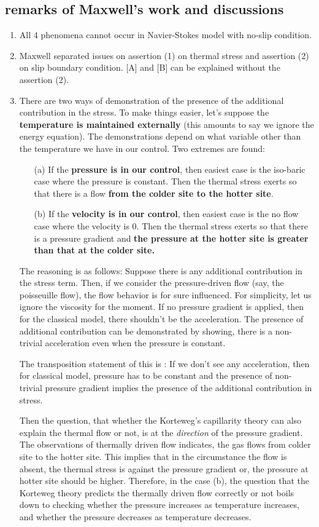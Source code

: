 \documentclass[a4paper,12pt]{article}
\begin{document}
\subsection{remarks of Maxwell's work and discussions}
\begin{enumerate}
 \item All 4 phenomena cannot occur in Navier-Stokes model with no-slip condition.
 \item Maxwell separated issues on assertion (1) on thermal stress and assertion (2) on slip boundary condition. [A] and [B] can be explained without the assertion (2).
 \item There are two ways of demonstration of the presence of the additional contribution in the stress. To make things easier, let's suppose the {\bf temperature is maintained externally} (this amounts to say we ignore the energy equation). The demonstrations depend on what variable other than the temperature we have in our control. Two extremes are found:
 \begin{enumerate}
  \item[(a)] If the {\bf pressure is in our control}, then easiest case is the iso-baric case where the pressure is constant. Then the thermal stress exerts so that there is a flow {\bf from the colder site to the hotter site}.
  \item[(b)] If the {\bf velocity is in our control}, then easiest case is the no flow case where the velocity is $0$. Then the thermal stress exerts so that there is a pressure gradient and {\bf the pressure at the hotter site is greater than that at the colder site.}
 \end{enumerate}

The reasoning is as follows: Suppose there is any additional contribution in the stress term. Then, if we consider the pressure-driven flow (say, the poisseuille flow), the flow behavior is for sure influenced. For simplicity, let us ignore the viscosity for the moment. If no pressure gradient is applied, then for the classical model, there shouldn't be the acceleration. The presence of additional contribution can be demonstrated by showing, there is a non-trivial acceleration even when the pressure is constant. 

The transposition statement of this is : If we don't see any acceleration, then for classical model, pressure has to be constant and the presence of non-trivial pressure gradient implies the presence of the additional contribution in stress.

Then the question, that whether the Korteweg's capillarity theory can also explain the thermal flow or not, is at the {\it direction} of the pressure gradient. The observations of thermally driven flow indicates, the gas flows from colder site to the hotter site. This implies that in the circumstance the flow is absent, the thermal stress is against the pressure gradient or, the pressure at hotter site should be higher. Therefore, in the case (b), the question that the Korteweg theory predicts the thermally driven flow correctly or not boils down to checking whether the pressure increases as temperature increases, and whether the pressure decreases as temperature decreases.


\end{enumerate}
\end{document}
